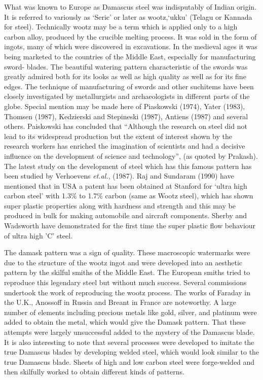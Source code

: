What was known to Europe as Damascus steel was indisputably of Indian origin. It is referred to variously as ‘Seric’ or later as wootz,‘ukku’ (Telagu or Kannada for steel). Technically wootz may be a term which is applied only to a high carbon alloy, produced by the crucible melting process. It was sold in the form of ingots, many of which were discovered in excavations. In the medieval ages it was being marketed to the countries of the Middle East, especially for manufacturing sword- blades. The beautiful watering pattern characteristic of the swords was greatly admired both for its looks as well as high quality as well as for its fine edges. The technique of manufacturing of swords and other suchitems have been closely investigated by metallurgists and archaeologists in different parts of the globe. Special mention may be made here of Piaskowski (1974), Yater (1983), Thomsen (1987), Kedzierski and Stepineski (1987), Antiens (1987) and several others. Paiskowski has concluded that “Although the research on steel did not lead to its widespread production but the extent of interest shown by the research workers has enriched the imagination of scientists and had a decisive influence on the development of science and technology”, (as quoted by Prakash). The latest study on the development of steel which has this famous pattern has been studied by Verhoevens \textit{et.al.}, (1987). Raj and Sundaram (1990) have mentioned that in USA a patent has been obtained at Stanford for ‘ultra high carbon steel’ with 1.3\% to 1.7\% carbon (same as Wootz steel), which has shown super plastic properties along with hardness and strength and this may be produced in bulk for making automobile and aircraft components. Sherby and Wadsworth have demonstrated for the first time the super plastic flow behaviour of ultra high 'C' steel.

The damask pattern was a sign of quality. These macroscopic watermarks were due to the structure of the wootz ingot and were developed into an aesthetic pattern by the skilful smiths of the Middle East. The European smiths tried to reproduce this legendary steel but without much success. Several commissions undertook the work of reproducing the wootz process. The works of Faraday in the U.K., Anossoff in Russia and Breant in France are noteworthy. A large number of elements including precious metals like gold, silver, and platinum were added to obtain the metal, which would give the Damask pattern. That these attempts were largely unsuccessful added to the mystery of the Damascus blade. It is also interesting to note that several processes were developed to imitate the true Damascus blades by developing welded steel, which would look similar to the true Damascus blade. Sheets of high and low carbon steel were forge-welded and then skilfully worked to obtain different kinds of patterns.

